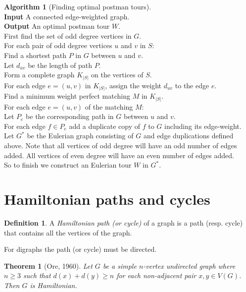 \documentclass{article}
\newtheorem*{thm}{Theorem}
\theoremstyle{definition}
\newtheorem*{defn}{Definition}
\newtheorem*{alg}{Algorithm}
\begin{document}
\begin{alg}[Finding optimal postman tours]~\\
\textbf{Input} A connected edge-weighted graph. \\
\textbf{Output} An optimal postman tour $W$. \\
First find the set of odd degree vertices in $G$. \\
For each pair of odd degree vertices $u$ and $v$ in $S$: \\
\indent Find a shortest path $P$ in $G$ between $u$ and $v$. \\
Let $d_{uv}$ be the length of path $P$. \\
Form a complete graph $K_{|S|}$ on the vertices of $S$.\\
For each edge $e = (u,v)$ in $K_{|S|}$, assign the weight $d_{uv}$ to the edge $e$.\\
Find a minimum weight perfect matching $M$ in $K_{|S|}$.\\
For each edge $e=(u,v)$ of the matching $M$: \\
\indent Let $P_e$ be the corresponding path in $G$ between $u$ and $v$. \\
\indent For each edge $f\in P_e$ add a duplicate copy of $f$ to $G$ including its edge-weight. \\
Let $G^*$ be the Eulerian graph consisting of $G$ and edge duplications defined above.
Note that all vertices of odd degree will have an odd number of edges added.
All vertices of even degree will have an even number of edges added. \\
So to finish we construct an Eulerian tour $W$ in $G^*$.
\end{alg}

\section{Hamiltonian paths and cycles}

\begin{defn}
A \emph{Hamiltonian path (or cycle)} of a graph is a path (resp. cycle) that contains all the vertices of the graph.
\end{defn}

For digraphs the path (or cycle) must be directed.

\begin{thm}[Ore, 1960]
Let $G$ be a simple $n$-vertex undirected graph where $n\ge 3$ such that $d(x) + d(y) \ge n$ for each non-adjacent pair $x,y\in V(G)$.
Then $G$ is Hamiltonian.
\end{thm}
\end{document}

